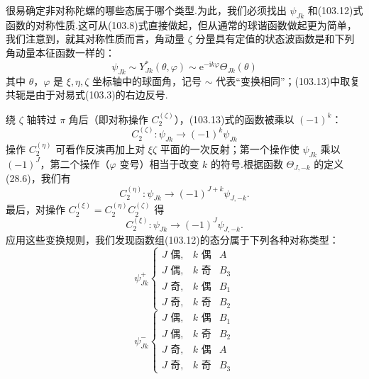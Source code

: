 很易确定非对称陀螺的哪些态属于哪个类型.为此，我们必须找出 $\psi_{Jk}$ 和(103.12)式函数的对称性质.这可从(103.8)式直接做起，但从通常的球谐函数做起更为简单，我们注意到，就其对称性质而言，角动量 $\zeta$ 分量具有定值的状态波函数是和下列角动量本征函数一样的：
\begin{equation}
  \psi_{Jk}\sim Y^*_{Jk}(\theta,\varphi)\sim\mathrm{e}^{-\mathrm{i}k\varphi}\Theta_{Jk}(\theta)
\end{equation}
其中 $\theta$，$\varphi$ 是 $\xi,\eta,\zeta$ 坐标轴中的球面角，记号 $\sim$ 代表“变换相同”；(103.13)中取复共轭是由于对易式(103.3)的右边反号.

绕 $\zeta$ 轴转过 $\pi$ 角后（即对称操作 $C_2^{(\zeta)}$），(103.13)式的函数被乘以 $(-1)^k$：
\begin{equation*}
  C_2^{(\zeta)}\colon\psi_{Jk}\longrightarrow(-1)^k\psi_{Jk}
\end{equation*}
操作 $C_2^{(\eta)}$ 可看作反演再加上对 $\xi\zeta$ 平面的一次反射；第一个操作使 $\psi_{Jk}$ 乘以 $(-1)^J$，第二个操作（$\varphi$ 变号）相当于改变 $k$ 的符号.根据函数 $\Theta_{J,-k}$ 的定义(28.6)，我们有
\begin{equation*}
  C_2^{(\eta)}\colon\psi_{Jk}\longrightarrow(-1)^{J+k}\psi_{J,-k}.
\end{equation*}
最后，对操作 $C_2^{(\xi)}=C_2^{(\eta)}C_2^{(\zeta)}$ 得
\begin{equation*}
  C_2^{(\xi)}\colon\psi_{Jk}\longrightarrow(-1)^J\psi_{J,-k}.
\end{equation*}
应用这些变换规则，我们发现函数组(103.12)的态分属于下列各种对称类型：
\begin{equation*}
  \psi^+_{Jk}\left\{\begin{array}{lll}
    J\text{ 偶}, & k\text{ 偶} & A\\
    J\text{ 偶}, & k\text{ 奇} & B_3\\
    J\text{ 奇}, & k\text{ 偶} & B_1\\
    J\text{ 奇}, & k\text{ 奇} & B_2
  \end{array}\right.
\end{equation*}
\begin{equation}
  \psi^-_{Jk}\left\{\begin{array}{lll}
    J\text{ 偶}, & k\text{ 偶} & B_1\\
    J\text{ 偶}, & k\text{ 奇} & B_2\\
    J\text{ 奇}, & k\text{ 偶} & A\\
    J\text{ 奇}, & k\text{ 奇} & B_3
  \end{array}\right.
\end{equation}

